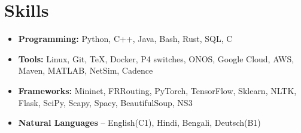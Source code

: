 \section{Skills}

\vspace{1pt}

\begin{itemize}

\item \textbf{Programming:} Python, C++, Java, Bash, Rust, SQL, C

\vspace{1pt}

\item \textbf{Tools:} Linux, Git, TeX, Docker, P4 switches, ONOS, Google Cloud, AWS, Maven, MATLAB, NetSim, Cadence
\vspace{1pt}

\item \textbf{Frameworks:} Mininet, FRRouting, PyTorch, TensorFlow, Sklearn, NLTK, Flask, SciPy, Scapy, Spacy, BeautifulSoup, NS3

\item \textbf{Natural Languages} -- English(C1), Hindi, Bengali, Deutsch(B1)

\end{itemize}